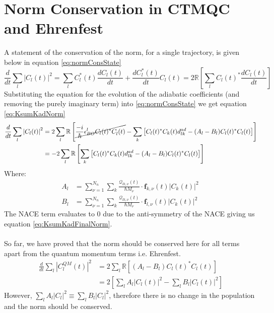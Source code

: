 \chapter{Norm Conservation in CTMQC and Ehrenfest}
\label{ap:norm_cons}
A statement of the conservation of the norm, for a single trajectory, is given below in equation \eqref{eq:normConsState}
\begin{equation}
	\frac{d}{dt} \sum_{l} \left\vert C_{l}(t) \right\vert^2 = \sum_{l} C_{l}^{*}(t)\frac{d C_{l}(t)}{dt} + \frac{d C_{l}^{*}(t)}{dt}C_{l}(t)
	\label{eq:normConsState} = 2 \mathbb{R} \left[ \sum_{l} C_{l}(t)^{*} \frac{d C_{l}(t)}{dt} \right]
\end{equation}
Substituting the equation for the evolution of the adiabatic coefficients (and removing the purely imaginary term) into \eqref{eq:normConsState} we get equation \eqref{eq:KsumKadNorm}
\begin{align}
	\frac{d}{dt} \sum_{l} \left\vert C_{l}(t) \right\vert^2 &= 2 \sum_{l} \mathbb{R} \left[ \cancel{\frac{-i}{\hbar} \epsilon_{BO}^{l} C_l(t)^*C_l^{}(t)}
	- \sum_{k} \left[ C_l(t)^*C_k(t) d_{lk}^{ad} - (A_l - B_{l}) C_l(t)^*C_l(t)  \right] \right]
	\\
	&= -2 \sum_{l} \mathbb{R} \left[ \sum_{k} \left[ C_l(t)^*C_k(t) d_{lk}^{ad} - (A_l - B_{l}) C_l(t)^*C_l(t)  \right] \right]
	\label{eq:KsumKadNorm}
\end{align}
Where:
\begin{align}
	A_{l} &= \sum_{\nu = 1}^{N_n} \sum_{k} \frac{\mathcal{Q}_{lk, \nu}(t)}{\hbar M_\nu}\cdot \mathbf{f}_{k, \nu}(t) \vert C_k(t) \vert^2 \ \\
	B_{l} &= \sum_{\nu = 1}^{N_n} \sum_{k} \frac{\mathcal{Q}_{lk, \nu}(t)}{\hbar M_\nu}\cdot \mathbf{f}_{l, \nu}(t) \vert C_{k}(t)\vert^2
\end{align}
The NACE term evaluates to 0 due to the anti-symmetry of the NACE giving us equation \eqref{eq:KsumKadFinalNorm}. 
\\\\
So far, we have proved that the norm should be conserved here for all terms apart from the quantum momentum terms i.e. Ehrenfest.
\begin{align}
	\frac{d}{dt} \sum_{l} \left\vert C^{QM}_{l}(t) \right\vert^2 &= 2 \sum_{l} \mathbb{R} \left[ (A_l - B_{l}) C_l(t)^*C_l(t)  \right] \\
	&= 2 \left[ \sum_l A_l |C_{l}(t)|^2 - \sum_{l} B_{l} \vert C_{l}(t) \vert^2 \right]
	\label{eq:KsumKadFinalNorm}
\end{align}
However, $\sum_{l}A_l |C_{l}|^2 \equiv \sum_{l} B_{l} |C_{l}|^2$, therefore there is no change in the population and the norm should be conserved.
